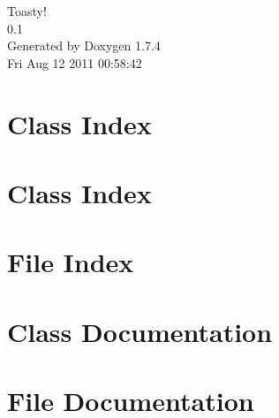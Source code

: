\documentclass[a4paper]{book}
\begin{document}
\hypersetup{pageanchor=false}
\begin{titlepage}
\vspace*{7cm}
\begin{center}
{\Large Toasty! \\[1ex]\large 0.1 }\\
\vspace*{1cm}
{\large Generated by Doxygen 1.7.4}\\
\vspace*{0.5cm}
{\small Fri Aug 12 2011 00:58:42}\\
\end{center}
\end{titlepage}
\clearemptydoublepage
{}
\tableofcontents
\clearemptydoublepage
{}
\hypersetup{pageanchor=true}
\chapter{Class Index}

\chapter{Class Index}

\chapter{File Index}

\chapter{Class Documentation}








\chapter{File Documentation}







\printindex
\end{document}
